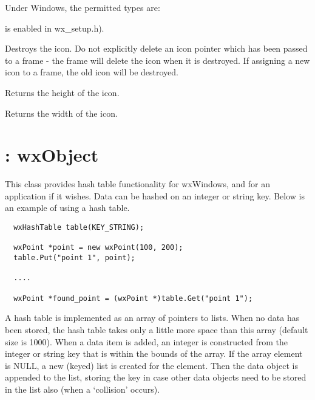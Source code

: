 Under Windows, the permitted types are:

\begin{twocollist}\itemsep=0pt
is enabled in wx\_setup.h).
\end{twocollist}



Destroys the icon.  Do not explicitly delete an icon pointer which has
been passed to a frame - the frame will delete the icon when it is
destroyed. If assigning a new icon to a frame, the old icon will be
destroyed.



Returns the height of the icon.



Returns the width of the icon.

\section{: wxObject}\label{wxhashtable}

This class provides hash table functionality for wxWindows, and for an
application if it wishes.  Data can be hashed on an integer or string
key.  Below is an example of using a hash table.

\begin{verbatim}
  wxHashTable table(KEY_STRING);

  wxPoint *point = new wxPoint(100, 200);
  table.Put("point 1", point);

  ....

  wxPoint *found_point = (wxPoint *)table.Get("point 1");
\end{verbatim}

A hash table is implemented as an array of pointers to lists. When no
data has been stored, the hash table takes only a little more space than
this array (default size is 1000).  When a data item is added, an
integer is constructed from the integer or string key that is within the
bounds of the array. If the array element is NULL, a new (keyed) list is
created for the element. Then the data object is appended to the list,
storing the key in case other data objects need to be stored in the list
also (when a `collision' occurs).

